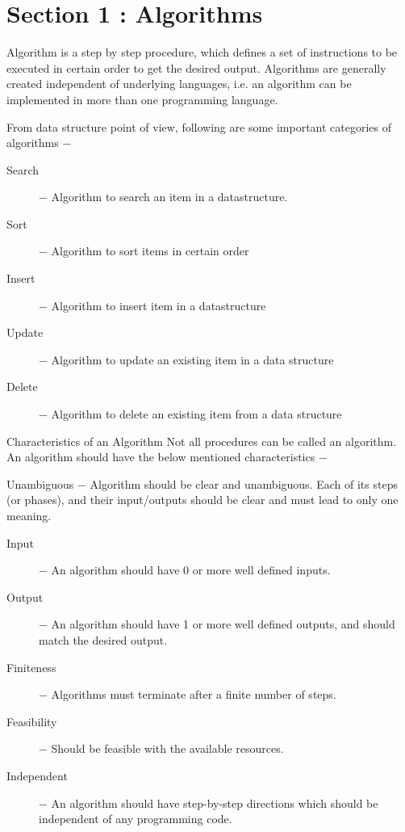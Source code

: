 \documentclass{beamer}
\begin{document}

\section{Section 1 : Algorithms}
\begin{frame}
Algorithm is a step by step procedure, which defines a set of instructions to be executed in certain order to get the desired output. Algorithms are generally created independent of underlying languages, i.e. an algorithm can be implemented in more than one programming language.

\end{frame}
\begin{frame}
From data structure point of view, following are some important categories of algorithms −

\begin{description}
	\item[Search] − Algorithm to search an item in a datastructure.
	\item[Sort] − Algorithm to sort items in certain order
	\item[Insert] − Algorithm to insert item in a datastructure
	\item[Update] − Algorithm to update an existing item in a data structure
	\item[Delete] − Algorithm to delete an existing item from a data structure
\end{description}

\end{frame}
\begin{frame}
Characteristics of an Algorithm
Not all procedures can be called an algorithm. An algorithm should have the below mentioned characteristics −

Unambiguous − Algorithm should be clear and unambiguous. Each of its steps (or phases), and their input/outputs should be clear and must lead to only one meaning.

\begin{description}
\item[Input] − An algorithm should have 0 or more well defined inputs.

\item[Output] − An algorithm should have 1 or more well defined outputs, and should match the desired output.

\item[Finiteness] − Algorithms must terminate after a finite number of steps.

\item[Feasibility] − Should be feasible with the available resources.

\item[Independent] − An algorithm should have step-by-step directions which should be independent of any programming code.
\end{description}
\end{frame}
\end{document}
